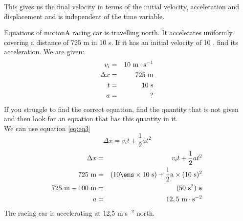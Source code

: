 This gives us the final velocity in terms of the initial velocity, acceleration and displacement and is independent of the time variable.

\begin{wex}{Equations of motion}{A racing car is travelling north. It accelerates uniformly  covering a distance of 725 m in 10 s. If it has an initial velocity of 10 \ms, find its acceleration.}
{ We are given:
\begin{eqnarray*}
v_i&=&10\ \rm{m} \cdot \rm{s}^{-1}\\
\Delta x&=&725\ \mathrm{m}\\
t&=&10\ \mathrm{s}\\
a&=&?
\end{eqnarray*}
If you struggle to find the correct equation, find the quantity that is not given and then look for an equation that has this quantity in it.\\
We can use equation \ref{eq:eq3}
\begin{displaymath}
\Delta x=v_it +\frac{1}{2}at^2
\end{displaymath}
\begin{eqnarray*}
\Delta x &=& v_it +\frac{1}{2}at^2\\
725\rm{~m} &=& (10\ems \times 10\rm{~s}) + \frac{1}{2} \rm{a} \times (10\rm{~s})^2\\
725\rm{~m} - 100\rm{~m} &=& (50\rm{~s}^2)~ \rm{a}\\
a &=& 12,5~ \rm{m} \cdot\rm{s}^{-2}
\end{eqnarray*}
The racing car is accelerating at 12,5 m$\cdot$s$^{-2}$ north.}
\end{wex}

